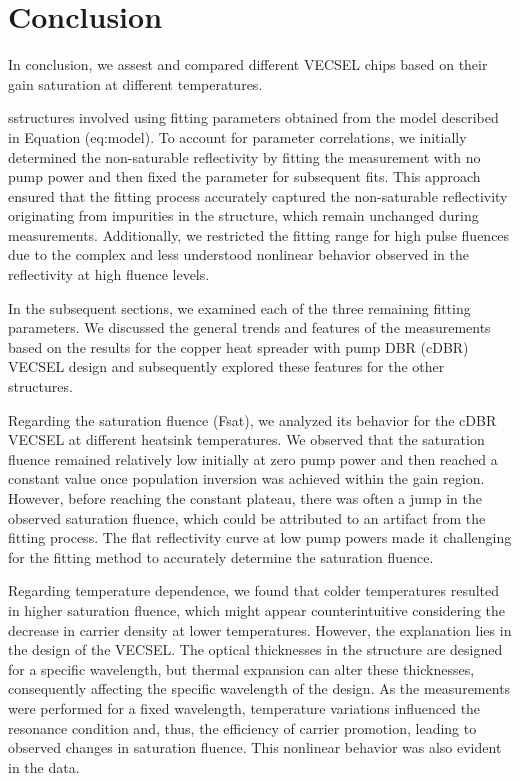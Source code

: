 \chapter{Conclusion}\label{chapter:Conclusion}

In conclusion, we assest and compared different VECSEL chips based on their gain saturation at different temperatures. 


sstructures involved using fitting parameters obtained from the model described in Equation (eq:model). To account for parameter correlations, we initially determined the non-saturable reflectivity by fitting the measurement with no pump power and then fixed the parameter for subsequent fits. This approach ensured that the fitting process accurately captured the non-saturable reflectivity originating from impurities in the structure, which remain unchanged during measurements. Additionally, we restricted the fitting range for high pulse fluences due to the complex and less understood nonlinear behavior observed in the reflectivity at high fluence levels.

In the subsequent sections, we examined each of the three remaining fitting parameters. We discussed the general trends and features of the measurements based on the results for the copper heat spreader with pump DBR (cDBR) VECSEL design and subsequently explored these features for the other structures.

Regarding the saturation fluence (Fsat), we analyzed its behavior for the cDBR VECSEL at different heatsink temperatures. We observed that the saturation fluence remained relatively low initially at zero pump power and then reached a constant value once population inversion was achieved within the gain region. However, before reaching the constant plateau, there was often a jump in the observed saturation fluence, which could be attributed to an artifact from the fitting process. The flat reflectivity curve at low pump powers made it challenging for the fitting method to accurately determine the saturation fluence.

Regarding temperature dependence, we found that colder temperatures resulted in higher saturation fluence, which might appear counterintuitive considering the decrease in carrier density at lower temperatures. However, the explanation lies in the design of the VECSEL. The optical thicknesses in the structure are designed for a specific wavelength, but thermal expansion can alter these thicknesses, consequently affecting the specific wavelength of the design. As the measurements were performed for a fixed wavelength, temperature variations influenced the resonance condition and, thus, the efficiency of carrier promotion, leading to observed changes in saturation fluence. This nonlinear behavior was also evident in the data.


